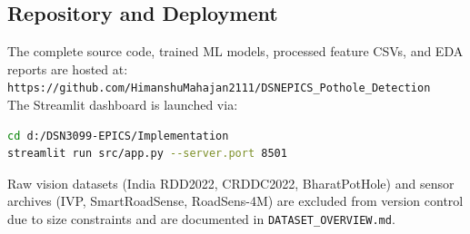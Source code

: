 \subsection{Repository and Deployment}
The complete source code, trained ML models, processed feature CSVs, and EDA reports are hosted at:\\[6pt]
\texttt{https://github.com/HimanshuMahajan2111/DSNEPICS\_Pothole\_Detection}\\[6pt]
The Streamlit dashboard is launched via:
\begin{lstlisting}[language=bash]
cd d:/DSN3099-EPICS/Implementation
streamlit run src/app.py --server.port 8501
\end{lstlisting}

Raw vision datasets (India RDD2022, CRDDC2022, BharatPotHole) and sensor archives (IVP, SmartRoadSense, RoadSens-4M) are excluded from version control due to size constraints and are documented in \texttt{DATASET\_OVERVIEW.md}.

